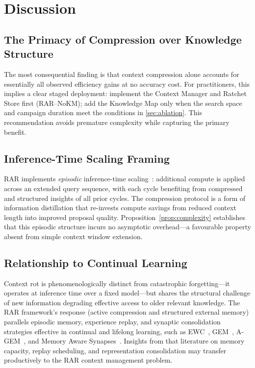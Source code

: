 \documentclass[conference]{IEEEtran}
\begin{document}
\section{Discussion}

\subsection{The Primacy of Compression over Knowledge Structure}
The most consequential finding is that context compression alone accounts for essentially all observed efficiency gains at no accuracy cost. For practitioners, this implies a clear staged deployment: implement the Context Manager and Ratchet Store first (RAR--NoKM); add the Knowledge Map only when the search space and campaign duration meet the conditions in \cref{sec:ablation}. This recommendation avoids premature complexity while capturing the primary benefit.

\subsection{Inference-Time Scaling Framing}
RAR implements \emph{episodic} inference-time scaling~\citep{snell2024scaling}: additional compute is applied across an extended query sequence, with each cycle benefiting from compressed and structured insights of all prior cycles. The compression protocol is a form of information distillation that re-invests compute savings from reduced context length into improved proposal quality. Proposition~\ref{prop:complexity} establishes that this episodic structure incurs no asymptotic overhead---a favourable property absent from simple context window extension.

\subsection{Relationship to Continual Learning}
Context rot is phenomenologically distinct from catastrophic forgetting---it operates at inference time over a fixed model---but shares the structural challenge of new information degrading effective access to older relevant knowledge. The RAR framework's response (active compression and structured external memory) parallels episodic memory, experience replay, and synaptic consolidation strategies effective in continual and lifelong learning, such as EWC~\citep{kirkpatrick2017ewc}, GEM~\citep{lopezpaz2017gem}, A-GEM~\citep{chaudhry2018efficient}, and Memory Aware Synapses~\citep{aljundi2018memory}. Insights from that literature on memory capacity, replay scheduling, and representation consolidation may transfer productively to the RAR context management problem.
\end{document}
